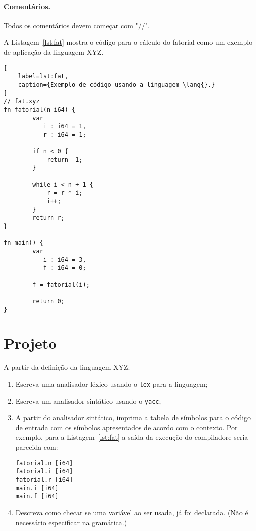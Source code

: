 \documentclass{article}
\def\lang{{\sc XYZ}}
\begin{document}
\paragraph{Comentários.} Todos os comentários devem começar com "//".

\pagebreak
A Listagem~\ref{lst:fat} mostra o código para o cálculo 
do fatorial como um exemplo de aplicação da linguagem 
\lang.

\begin{lstlisting}[
    label=lst:fat,
    caption={Exemplo de código usando a linguagem \lang{}.}
]
// fat.xyz
fn fatorial(n i64) {
        var
           i : i64 = 1,
           r : i64 = 1;
    
        if n < 0 {
            return -1;
        }

        while i < n + 1 {
            r = r * i;
            i++;
        }
        return r;
}
    
fn main() {
        var 
           i : i64 = 3,
           f : i64 = 0;
    
        f = fatorial(i);

        return 0;
}
\end{lstlisting}

\section*{Projeto}

A partir da definição da linguagem \lang:

\begin{enumerate}
\item Escreva uma analisador léxico usando o {\tt lex} 
para a linguagem;
\item Escreva um analisador sintático usando o {\tt yacc};
\item A partir do analisador sintático, imprima a tabela de 
símbolos para o código de entrada com os símbolos apresentados 
de acordo com o contexto. Por exemplo, para a Listagem~\ref{lst:fat}
a saída da execução do compiladore seria parecida com:

\begin{verbatim}
fatorial.n [i64]
fatorial.i [i64]
fatorial.r [i64]
main.i [i64]
main.f [i64]
\end{verbatim}

\item Descreva como checar se uma variável ao ser usada, já foi
  declarada. (Não é necessário especificar na gramática.)
\end{enumerate}
\end{document}
